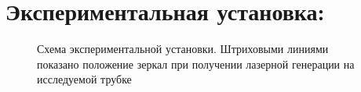 \section*{Экспериментальная установка:}
    \begin{figure}[h!]
        \noindent{}
        \caption{Схема экспериментальной установки. Штриховыми линиями показано положение зеркал при получении лазерной генерации на исследуемой трубке}
    \end{figure}